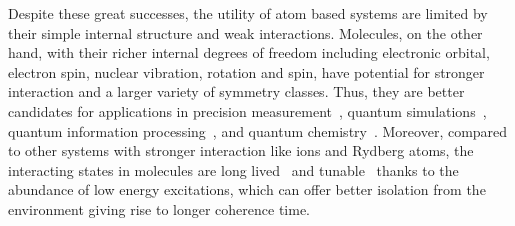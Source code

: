 Despite these great successes, the utility of atom based systems
are limited by their simple internal structure and weak interactions.
Molecules, on the other hand, with their richer internal degrees of freedom
including electronic orbital, electron spin, nuclear vibration, rotation and spin,
have potential for stronger interaction and a larger variety of symmetry classes.
Thus, they are better candidates for applications in
precision measurement~\cite{bickman_preparation_2009,hudson_improved_2011,eckel_search_2013,
  kozyryev_precision_2017,cairncross_precision_2017,acme_collaboration_improved_2018,
  kondov_molecular_2019,flambaum_electric_2020},
quantum simulations~\cite{micheli_toolbox_2006,buchler_strongly_2007,gorshkov_tunable_2011,
  baranov_condensed_2012,yao_realizing_2013,syzranov_spin-orbital_2014,
  wall_quantum_2015,wall_realizing_2015,peter_topological_2015,
  yao_quantum_2018,sundar_synthetic_2018,schuster_realizing_2019},
quantum information processing~\cite{demille_quantum_2002,ni_dipolar_2018,
  hudson_dipolar_2018,lin_quantum_2020},
and quantum chemistry~\cite{balakrishnan_perspective_2016,hu_direct_2019,
  segev_collisions_2019,jongh_imaging_2020}.
Moreover, compared to other systems with stronger interaction like ions and Rydberg atoms,
the interacting states in molecules are long lived~\cite{fedorov_accurate_2014}
and tunable~\cite{giovanazzi_tuning_2002} thanks to the abundance of low energy excitations,
which can offer better isolation from the environment giving rise to longer coherence time.

